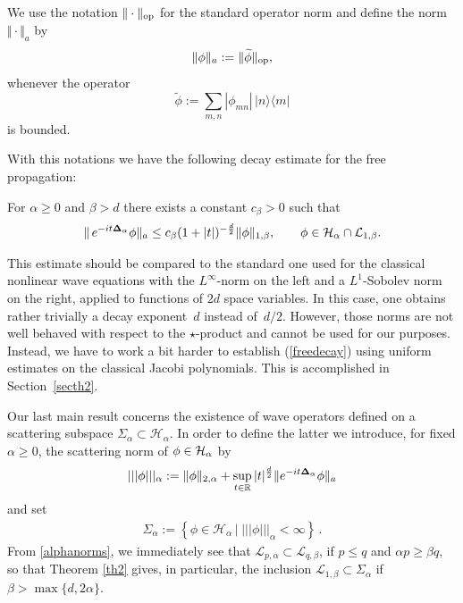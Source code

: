 \documentclass[pdftex]{sigma}
\begin{document}
We use the notation $\Vert\cdot\Vert_{\rm op}$ for
the standard operator norm and def\/ine the norm $\Vert\cdot\Vert_a$ by
\[
\Vert\phi\Vert_a := \Vert\widetilde\phi\Vert_{\rm op} ,
\]
whenever the operator
\[
 \widetilde\phi := \sum_{m,n}|\phi_{mn}|\, |n\rangle\langle m|
\]
 is bounded.


With this notations we have the following decay estimate for the free
propagation:
\begin{theorem}\label{th2} For $\alpha\geq 0$ and  $\beta > d$ there exists a constant
$c_\beta>0$ such that
\begin{gather}\label{freedecay}
\Vert\, e^{-it{\bf\Delta}_\alpha}\phi \Vert_a  \leq  c_{\beta}(1+
|t|)^{-\frac{d}{2}} \Vert\phi\Vert_{1,\beta} ,
\qquad \phi\in {\cal H}_\alpha\cap {\cal L}_{1,\beta} .
\end{gather}
\end{theorem}

This estimate should be compared to the standard one used for the
classical nonlinear wave equations with the $L^\infty$-norm on the
left and a $L^1$-Sobolev norm on the right, applied to
functions of $2d$ space variables. In this case, one obtains rather
trivially a decay exponent~$d$ instead of~$d/2$. However, those norms
are not well behaved with respect to the $\star$-product and cannot be
used for our purposes. Instead, we have to work a bit harder to establish
(\ref{freedecay}) using uniform estimates on the classical Jacobi
polynomials. This is accomplished in Section~\ref{secth2}.



Our last main result concerns the existence of wave operators
def\/ined on a scattering subspace $\Sigma_\alpha\subset \mathcal H_\alpha$. In order to def\/ine
the latter we introduce, for f\/ixed $\alpha\geq 0$, the scattering norm
of $\phi\in{\cal H}_\alpha$ by
\begin{gather*}%
|||\phi|||_{\alpha}:=
\Vert\phi\Vert_{2,\alpha}+\sup_{t\in\mathbb R} |t|^{\frac d2}
\Vert e^{-it{\bf\Delta}_\alpha}\phi\Vert_a
\end{gather*}
and set
\begin{gather*}
\Sigma_{\alpha}:=\left\{\phi\in\mathcal H_\alpha\,|\;|||\phi|||_{\alpha}<\infty\right\}\,.
\end{gather*}
From \eqref{alphanorms}, we immediately see that
$\mathcal L_{p,\alpha}\subset\mathcal L_{q,\beta}$, if $p\leq q$ and
$\alpha p\geq\beta q$, so that Theorem \ref{th2} gives, in particular, the
inclusion $\mathcal L_{1,\beta}\subset\Sigma_\alpha$ if $\beta> \max\{d, 2\alpha\}$.
\end{document}
